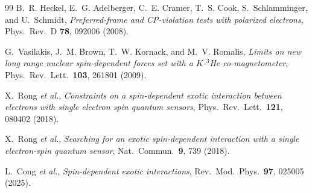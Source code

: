 \documentclass[main]{subfiles}
\begin{document}
{\begin{thebibliography}{99}
B.~R. Heckel, E.~G. Adelberger, C.~E. Cramer, T.~S. Cook, S.~Schlamminger,
and U.~Schmidt,
\textit{Preferred-frame and CP-violation tests with polarized electrons},
Phys.\ Rev.\ D \textbf{78}, 092006 (2008).

G.~Vasilakis, J.~M. Brown, T.~W. Kornack, and M.~V. Romalis,
\textit{Limits on new long range nuclear spin-dependent forces set with a
$K$-$^{3}$He co-magnetometer},
Phys.\ Rev.\ Lett.\ \textbf{103}, 261801 (2009).

X.~Rong \textit{et al.},
\textit{Constraints on a spin-dependent exotic interaction between electrons
with single electron spin quantum sensors},
Phys.\ Rev.\ Lett.\ \textbf{121}, 080402 (2018).

X.~Rong \textit{et al.},
\textit{Searching for an exotic spin-dependent interaction with a single
electron-spin quantum sensor},
Nat.\ Commun.\ \textbf{9}, 739 (2018).

L.~Cong \textit{et al.},
\textit{Spin-dependent exotic interactions},
Rev.\ Mod.\ Phys.\ \textbf{97}, 025005 (2025).

\end{thebibliography}
}{}
\end{document}
